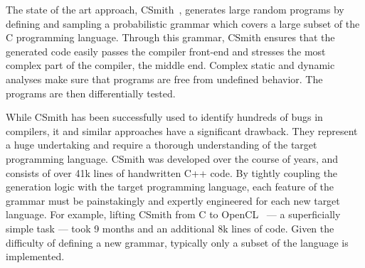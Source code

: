 The state of the art approach, CSmith~\cite{Yang2011}, generates large random programs by defining and sampling a probabilistic grammar which covers a large subset of the C programming language. Through this grammar, CSmith ensures that the generated code easily passes the compiler front-end and stresses the most complex part of the compiler, the middle end.  Complex static and dynamic analyses make sure that programs are free from undefined behavior. The programs are then differentially tested.

While CSmith has been successfully used to identify hundreds of bugs in compilers, it and similar approaches have a significant drawback. They represent a huge undertaking and require a thorough understanding of the target programming language. CSmith was developed over the course of years, and consists of over 41k lines of handwritten C++ code. By tightly coupling the generation logic with the target programming language, each feature of the grammar must be painstakingly and expertly engineered for each new target language. For example, lifting CSmith from C to OpenCL~\cite{Lidbury2015a} --- a superficially simple task --- took 9 months and an additional 8k lines of code. Given the difficulty of defining a new grammar, typically only a subset of the language is implemented.





